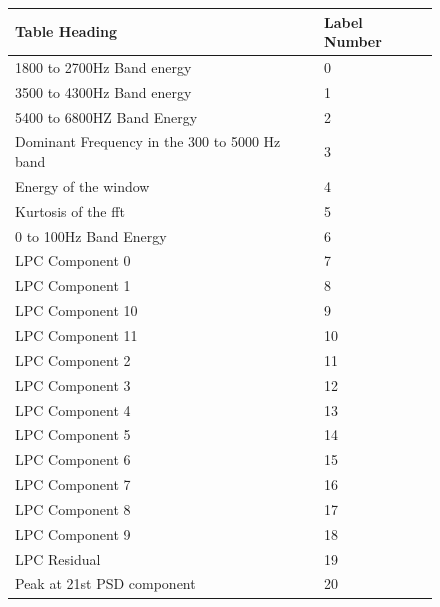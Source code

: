 \documentclass[ %
                    author={Sam Phippen},
                supervisor={Dr. Rafal Bogacz},
                     title={Real time voice activity detectors in noisy personal computing environments},
                  subtitle={},
                    degree={MEng},
                      year={2012} ]{thesis}
\begin{document}
\begin{figure}
    \begin{center}
        \begin{tabular}{ |l|l| }
            \hline
            Table Heading                                 & Label Number \\ \hline
            1800 to 2700Hz Band energy                    & 0 \\ \hline
            3500 to 4300Hz Band energy                    & 1 \\ \hline
            5400 to 6800HZ Band Energy                    & 2 \\ \hline
            Dominant Frequency in the 300 to 5000 Hz band & 3 \\ \hline
            Energy of the window                          & 4 \\ \hline
            Kurtosis of the fft                           & 5 \\ \hline
            0 to 100Hz Band Energy                        & 6 \\ \hline
            LPC Component 0                               & 7 \\ \hline
            LPC Component 1                               & 8 \\ \hline
            LPC Component 10                              & 9 \\ \hline
            LPC Component 11                              & 10 \\ \hline
            LPC Component 2                               & 11 \\ \hline
            LPC Component 3                               & 12 \\ \hline
            LPC Component 4                               & 13 \\ \hline
            LPC Component 5                               & 14 \\ \hline
            LPC Component 6                               & 15 \\ \hline
            LPC Component 7                               & 16 \\ \hline
            LPC Component 8                               & 17 \\ \hline
            LPC Component 9                               & 18 \\ \hline
            LPC Residual                                  & 19 \\ \hline
            Peak at 21st PSD component                    & 20 \\ \hline

\end{tabular}
\end{center}
\end{figure}
\end{document}
